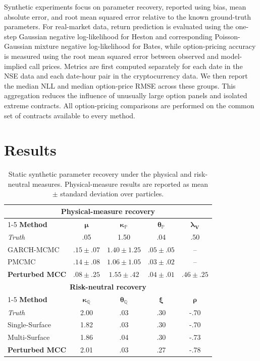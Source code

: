 \documentclass[sigconf,anonymous,review]{acmart}
\begin{document}
Synthetic experiments focus on parameter recovery, reported using bias, mean absolute error, and root mean squared error relative to the known ground-truth parameters. For real-market data, return prediction is evaluated using the one-step Gaussian negative log-likelihood for Heston and corresponding Poisson-Gaussian mixture negative log-likelihood for
Bates, while option-pricing accuracy is measured using the root mean squared error between observed and model-implied call prices.
Metrics are first computed separately for each date in the NSE data and each date-hour pair in the cryptocurrency data. We then report the median NLL and median option-price RMSE across these groups. This aggregation reduces the influence of unusually large option panels and isolated extreme contracts. All option-pricing comparisons are performed on the common set of contracts available to every method.

\section{Results}

\begin{table}[!t]
\centering
\caption{Static synthetic parameter recovery under the physical and risk-neutral measures. Physical-measure results are reported as mean $\pm$ standard deviation over particles.}
\label{tab:static_parameter_recovery}
\small
\setlength{\tabcolsep}{5pt}
\begin{tabular}{lcccc}
\toprule
\multicolumn{5}{c}{\textbf{Physical-measure recovery}} \\
\cmidrule(lr){1-5}
\textbf{Method}
& $\boldsymbol{\mu}$
& $\boldsymbol{\kappa_{\mathbb{P}}}$
& $\boldsymbol{\theta_{\mathbb{P}}}$
& $\boldsymbol{\lambda_V}$ \\
\midrule
\textit{Truth}
& .05
& 1.50
& .04
& .50 \\

GARCH-MCMC
& $.15 \pm .07$
& $1.40 \pm 1.25$
& $.05 \pm .05$
& -- \\

PMCMC
& $.14 \pm .08$
& $1.06 \pm 1.05$
& $.03 \pm .02$
& -- \\

\textbf{Perturbed MCC}
& $.08 \pm .25$
& $1.55 \pm .42$
& $.04 \pm .01$
& $.46 \pm .25$ \\
\midrule
\multicolumn{5}{c}{\textbf{Risk-neutral recovery}} \\
\cmidrule(lr){1-5}
\textbf{Method}
& $\boldsymbol{\kappa_{\mathbb{Q}}}$
& $\boldsymbol{\theta_{\mathbb{Q}}}$
& $\boldsymbol{\xi}$
& $\boldsymbol{\rho}$ \\
\midrule
\textit{Truth}
& 2.00
& .03
& .30
& -.70 \\

Single-Surface
& 1.82
& .03
& .30
& -.70 \\

Multi-Surface
& 1.86
& .04
& .30
& -.73 \\

\textbf{Perturbed MCC}
& 2.01
& .03
& .27
& -.78 \\
\bottomrule
\end{tabular}
\end{table}
\end{document}
